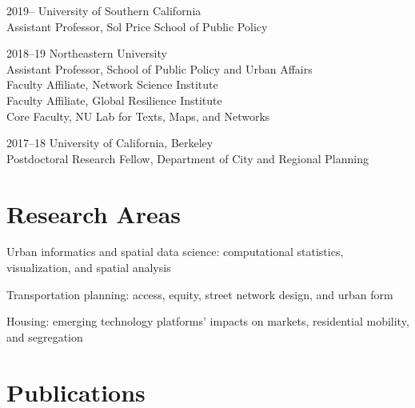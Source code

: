 \documentclass[12pt,letterpaper]{report}
\newcommand{\listitemspace}{0.15em}
\renewenvironment{itemize}
{\begin{list}{}{\setlength{\leftmargin}{0em}
            \setlength{\parskip}{0em}
            \setlength{\itemsep}{\listitemspace}
            \setlength{\parsep}{\listitemspace}}}
    {\end{list}}
\begin{document}
    \begin{tablist}

        \item[2019--]   \tab University of Southern California \\
                             Assistant Professor, Sol Price School of Public Policy

        \item[2018--19] \tab Northeastern University \\
                             Assistant Professor, School of Public Policy and Urban Affairs \\
                             Faculty Affiliate, Network Science Institute \\
                             Faculty Affiliate, Global Resilience Institute \\
                             Core Faculty, NU Lab for Texts, Maps, and Networks

        \item[2017--18] \tab University of California, Berkeley \\
                             Postdoctoral Research Fellow, Department of City and Regional Planning

    \end{tablist}



    \section*{Research Areas}

    \begin{itemize}

        \item Urban informatics and spatial data science: computational statistics, visualization, and spatial analysis

        \item Transportation planning: access, equity, street network design, and urban form

        \item Housing: emerging technology platforms' impacts on markets, residential mobility, and segregation

    \end{itemize}



    \section*{Publications}
\end{document}
